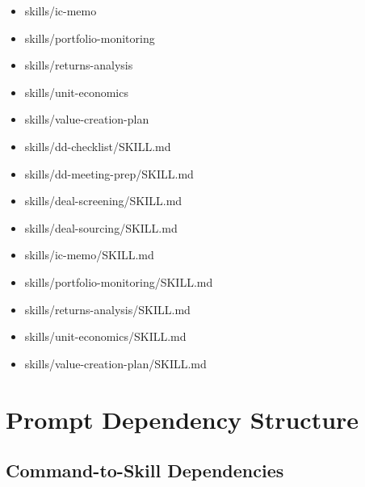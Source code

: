 \documentclass[11pt]{article}
\begin{document}
\begin{itemize}[leftmargin=*,itemsep=1pt,topsep=2pt]
\item \hspace*{0.9em}skills/ic-memo
\item \hspace*{0.9em}skills/portfolio-monitoring
\item \hspace*{0.9em}skills/returns-analysis
\item \hspace*{0.9em}skills/unit-economics
\item \hspace*{0.9em}skills/value-creation-plan
\item \hspace*{1.8em}skills/dd-checklist/SKILL.md
\item \hspace*{1.8em}skills/dd-meeting-prep/SKILL.md
\item \hspace*{1.8em}skills/deal-screening/SKILL.md
\item \hspace*{1.8em}skills/deal-sourcing/SKILL.md
\item \hspace*{1.8em}skills/ic-memo/SKILL.md
\item \hspace*{1.8em}skills/portfolio-monitoring/SKILL.md
\item \hspace*{1.8em}skills/returns-analysis/SKILL.md
\item \hspace*{1.8em}skills/unit-economics/SKILL.md
\item \hspace*{1.8em}skills/value-creation-plan/SKILL.md
\end{itemize}

\section{Prompt Dependency Structure}

\subsection{Command-to-Skill Dependencies}
\end{document}
